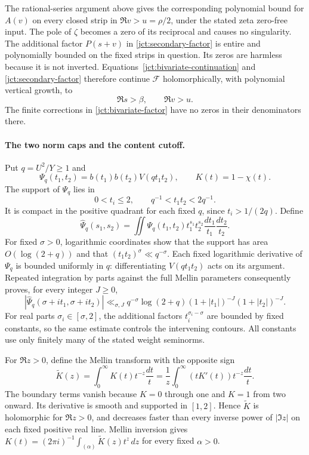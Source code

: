 The rational-series argument above gives the corresponding
polynomial bound for \(A(v)\) on every closed strip in
\(\Re v>u=\rho/2\), under the stated zeta zero-free input.
The pole of \(\zeta\) becomes a zero of its reciprocal and causes
no singularity. The additional factor \(P(s+v)\) in
\eqref{jct:secondary-factor} is entire and polynomially bounded
on the fixed strips in question. Its zeros are harmless because
it is not inverted.
Equations~\eqref{jct:bivariate-continuation} and
\eqref{jct:secondary-factor} therefore continue \(\mathcal F\)
holomorphically, with polynomial vertical growth, to
\begin{equation}
 \Re s>\beta,\qquad \Re v>u.
 \label{jct:tube}
\end{equation}
The finite corrections in \eqref{jct:bivariate-factor} have no
zeros in their denominators there.

\paragraph{The two norm caps and the content cutoff.}
Put \(q=U^2/Y\ge1\) and
\[
 \Psi_q(t_1,t_2)=b(t_1)b(t_2)V(qt_1t_2),\qquad
 K(t)=1-\chi(t).
\]
The support of \(\Psi_q\) lies in
\[
 0<t_i\le2,\qquad q^{-1}<t_1t_2<2q^{-1}.
\]
It is compact in the positive quadrant for each fixed \(q\),
since \(t_i>1/(2q)\).  Define
\[
 \widehat\Psi_q(s_1,s_2)=\iint
 \Psi_q(t_1,t_2)t_1^{s_1}t_2^{s_2}
 \frac{dt_1}{t_1}\frac{dt_2}{t_2}.
\]
For fixed \(\sigma>0\), logarithmic coordinates show that the
support has area \(O(\log(2+q))\) and that
\((t_1t_2)^\sigma\ll q^{-\sigma}\).
Each fixed logarithmic derivative of \(\Psi_q\) is bounded
uniformly in \(q\): differentiating \(V(qt_1t_2)\) acts on
its argument.  Repeated integration by parts against the full
Mellin parameters consequently proves, for every integer \(J\ge0\),
\begin{equation}
 |\widehat\Psi_q(\sigma+it_1,\sigma+it_2)|
 \ll_{\sigma,J}q^{-\sigma}\log(2+q)
 (1+|t_1|)^{-J}(1+|t_2|)^{-J}.
 \label{jct:norm-caps}
\end{equation}
For real parts \(\sigma_i\in[\sigma,2]\), the additional
factors \(t_i^{\sigma_i-\sigma}\) are bounded by fixed constants,
so the same estimate controls the intervening contours.
All constants use only finitely many of the stated weight seminorms.

For \(\Re z>0\), define the Mellin transform with the opposite sign
\begin{equation}
 \widetilde K(z)=\int_0^\infty K(t)t^{-z}\frac{dt}{t}
 =\frac1z\int_0^\infty (tK'(t))t^{-z}\frac{dt}{t}.
 \label{jct:cutoff-mellin}
\end{equation}
The boundary terms vanish because \(K=0\) through one and
\(K=1\) from two onward.  Its derivative is smooth and supported
in \([1,2]\).  Hence \(\widetilde K\) is holomorphic for
\(\Re z>0\), and decreases faster than every inverse power of
\(|\Im z|\) on each fixed positive real line.  Mellin inversion gives
\(K(t)=(2\pi i)^{-1}\int_{(\alpha)}\widetilde K(z)t^z\,dz\)
for every fixed \(\alpha>0\).

